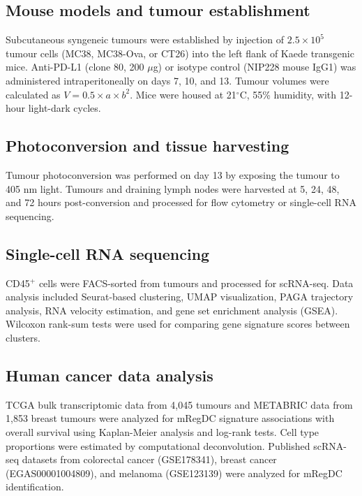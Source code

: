 \documentclass[11pt]{article}
\begin{document}
\subsection{Mouse models and tumour establishment}

Subcutaneous syngeneic tumours were established by injection of $2.5 \times 10^{5}$ tumour cells (MC38, MC38-Ova, or CT26) into the left flank of Kaede transgenic mice. Anti-PD-L1 (clone 80, 200 $\mu$g) or isotype control (NIP228 mouse IgG1) was administered intraperitoneally on days 7, 10, and 13. Tumour volumes were calculated as $V = 0.5 \times a \times b^{2}$. Mice were housed at 21$^{\circ}$C, 55\% humidity, with 12-hour light-dark cycles.

\subsection{Photoconversion and tissue harvesting}

Tumour photoconversion was performed on day 13 by exposing the tumour to 405 nm light. Tumours and draining lymph nodes were harvested at 5, 24, 48, and 72 hours post-conversion and processed for flow cytometry or single-cell RNA sequencing.

\subsection{Single-cell RNA sequencing}

CD45$^{+}$ cells were FACS-sorted from tumours and processed for scRNA-seq. Data analysis included Seurat-based clustering, UMAP visualization, PAGA trajectory analysis, RNA velocity estimation, and gene set enrichment analysis (GSEA). Wilcoxon rank-sum tests were used for comparing gene signature scores between clusters.

\subsection{Human cancer data analysis}

TCGA bulk transcriptomic data from 4,045 tumours and METABRIC data from 1,853 breast tumours were analyzed for mRegDC signature associations with overall survival using Kaplan-Meier analysis and log-rank tests. Cell type proportions were estimated by computational deconvolution. Published scRNA-seq datasets from colorectal cancer (GSE178341), breast cancer (EGAS00001004809), and melanoma (GSE123139) were analyzed for mRegDC identification.
\end{document}
